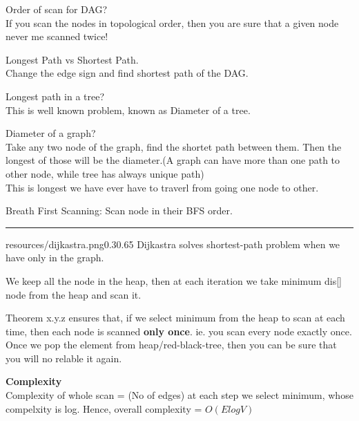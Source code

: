 Order of scan for DAG?\\
If you scan the nodes in topological order, then you are sure that a given node never me scanned twice!

Longest Path vs Shortest Path.\\
Change the edge sign and find shortest path of the DAG.

Longest path in a tree?\\
This is well known problem, known as Diameter of a tree.


Diameter of a graph?\\
Take any two node of the graph, find the shortet path between them. Then the longest of those will be the diameter.(A graph can have more than one path to other node, while tree has always unique path)
\\This is longest we have ever have to traverl from going one node to other.

Breath First Scanning: Scan node in their BFS order.

\rule{\linewidth}{0.2em}

\begin{lfigure}{resources/dijkastra.png}{0.3}{0.65}
    Dijkastra solves shortest-path problem when we have only  in the graph. 

    We keep all the node in the heap, then at each iteration we take minimum dis[] node from the heap and scan it.

    Theorem x.y.z ensures that, if we select minimum from the heap to scan at each time, then each node is scanned \textbf{only once}. ie. you scan every node exactly once. Once we pop the element from heap/red-black-tree, then you can be sure that you will no relable it again.

    \textbf{Complexity}\\
    Complexity of whole scan = (No of edges)
    at each step we select minimum, whose compelxity is log.
    Hence, overall complexity = $O(ElogV)$


\end{lfigure}

